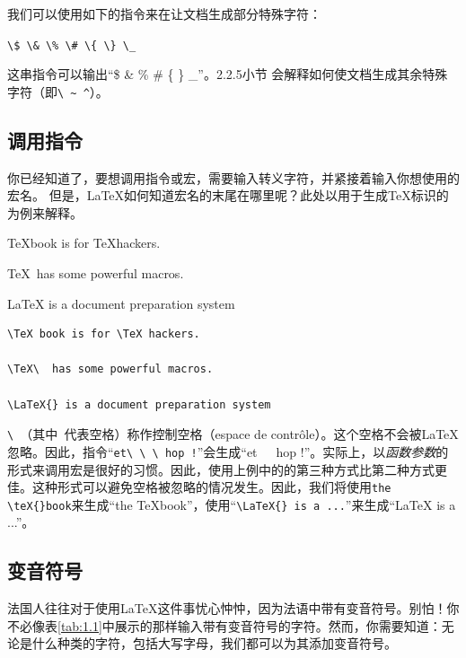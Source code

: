 我们可以使用如下的指令来在让文档生成部分特殊字符：

\begin{dmd}
    \verb+\$ \& \% \# \{ \} \_+
\end{dmd}

这串指令可以输出“\$ \& \% \# \{ \} \_”。2.2.5小节%
会解释如何使文档生成其余特殊字符（即\verb+\ ~ ^+）。

\subsection{调用指令}

你已经知道了，要想调用指令或宏，需要输入转义字符，并紧接着输入你想使用的宏名。%
但是，\LaTeX 如何知道宏名的末尾在哪里呢？此处以用于生成\TeX 标识的为例来解释。

\begin{codelist}{
    \TeX book is for \TeX hackers.

    \TeX\  has some powerful macros.

    \LaTeX{} is a document preparation system
}\begin{verbatim}\TeX book is for \TeX hackers.

\TeX\  has some powerful macros.

\LaTeX{} is a document preparation system
    \end{verbatim}
\end{codelist}

\begin{exclamation}
    \verb*|\ |（其中\verb*| |代表空格）称作控制空格（espace de contrôle）。这个空格不会被\LaTeX 忽略。因此，指令“\verb*|et\ \ \ hop !|”会生成“et\ \ \ hop !”。实际上，以\dm{\backslash}\textsl{\<函数\>}\dm{\{}\textsl{\<参数\>}\dm{\}}的形式来调用宏是很好的习惯。因此，使用上例中的的第三种方式比第二种方式更佳。这种形式可以避免空格被忽略的情况发生。因此，我们将使用\verb|the \teX{}book|来生成“the \TeX{}book”，使用“\verb*|\LaTeX{} is a ...|”来生成“\LaTeX{} is a ...”。
\end{exclamation}

\subsection{变音符号}

法国人往往对于使用\LaTeX 这件事忧心忡忡，因为法语中带有变音符号。别怕！你不必像表\ref{tab:1.1}中展示的那样输入带有变音符号的字符。然而，你需要知道：无论是什么种类的字符，包括大写字母，我们都可以为其添加变音符号。

